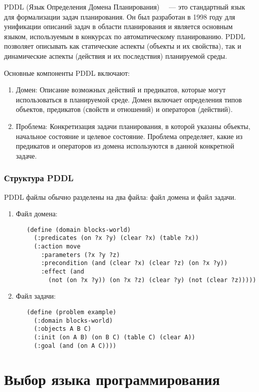 \documentclass{article}
\begin{document}
PDDL (Язык Определения Домена Планирования)~\cite{mcdermott1998pddl}~\cite{gerevini2006pddl3} — это стандартный язык для формализации задач планирования. Он был разработан в 1998 году для унификации описаний задач в области планирования и является основным языком, используемым в конкурсах по автоматическому планированию. PDDL позволяет описывать как статические аспекты (объекты и их свойства), так и динамические аспекты (действия и их последствия) планируемой среды.

Основные компоненты PDDL включают:
\begin{enumerate}
  \item Домен: Описание возможных действий и предикатов, которые могут использоваться в планируемой среде. Домен включает определения типов объектов, предикатов (свойств и отношений) и операторов (действий).
  \item Проблема: Конкретизация задачи планирования, в которой указаны объекты, начальное состояние и целевое состояние. Проблема определяет, какие из предикатов и операторов из домена используются в данной конкретной задаче.
\end{enumerate}

\subsubsection{Структура PDDL}

PDDL файлы обычно разделены на два файла: файл домена и файл задачи.

\begin{enumerate}
\item Файл домена:
  \begin{verbatim}
   (define (domain blocks-world)
     (:predicates (on ?x ?y) (clear ?x) (table ?x))
     (:action move
       :parameters (?x ?y ?z)
       :precondition (and (clear ?x) (clear ?z) (on ?x ?y))
       :effect (and
         (not (on ?x ?y)) (on ?x ?z) (clear ?y) (not (clear ?z)))))
  \end{verbatim}

\item Файл задачи:
  \begin{verbatim}
   (define (problem example)
     (:domain blocks-world)
     (:objects A B C)
     (:init (on A B) (on B C) (table C) (clear A))
     (:goal (and (on A C))))
  \end{verbatim}
\end{enumerate}

\newpage

\section{Выбор языка программирования}
\end{document}
